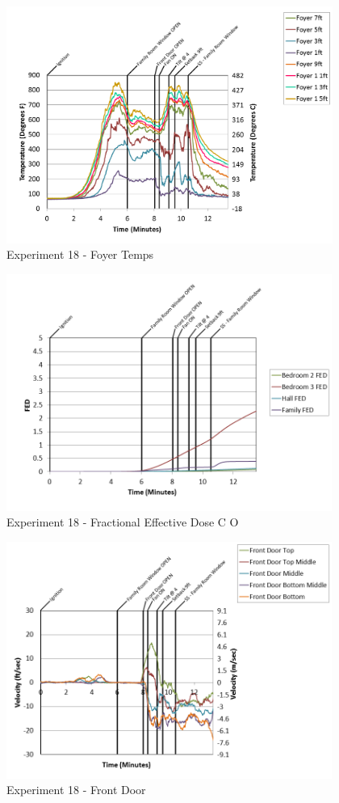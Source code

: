 \documentclass{article}
\begin{document}
\begin{appendices}
\clearpage

\begin{figure}[h!]
	\centering
	\includegraphics[height=3.05in]{0_Images/Results_Charts/Exp_18_Charts/FoyerTemps.png}
	\caption{Experiment 18 - Foyer Temps}
\end{figure}


\begin{figure}[h!]
	\centering
	\includegraphics[height=3.05in]{0_Images/Results_Charts/Exp_18_Charts/FractionalEffectiveDoseCO.png}
	\caption{Experiment 18 - Fractional Effective Dose C O}
\end{figure}

\clearpage

\begin{figure}[h!]
	\centering
	\includegraphics[height=3.05in]{0_Images/Results_Charts/Exp_18_Charts/FrontDoor.png}
	\caption{Experiment 18 - Front Door}
\end{figure}



\end{appendices}
\end{document}
